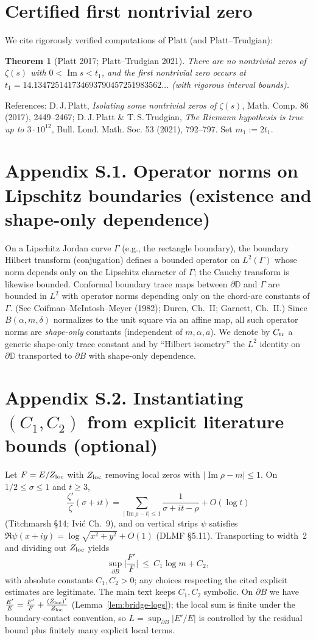 \documentclass[11pt]{article}
\numberwithin{equation}{section}
\newtheorem{theorem}{Theorem}[section]
\theoremstyle{remark}
\newcommand{\D}{\mathbb{D}}
\DeclareMathOperator{\Imag}{Im}
\begin{document}
\section{Certified first nontrivial zero}\label{app:firstheight-certified}
We cite rigorously verified computations of Platt (and Platt--Trudgian):
\begin{theorem}[Platt 2017; Platt--Trudgian 2021]
There are no nontrivial zeros of $\zeta(s)$ with $0<\Imag s<t_1$, and the first nontrivial zero occurs at
$t_1=14.134725141734693790457251983562\ldots$ (with rigorous interval bounds).
\end{theorem}
References:
D.\,J.\,Platt, \emph{Isolating some nontrivial zeros of $\zeta(s)$}, Math. Comp. 86 (2017), 2449–2467;
D.\,J.\,Platt \& T.\,S.\,Trudgian, \emph{The Riemann hypothesis is true up to $3\cdot 10^{12}$}, Bull. Lond. Math. Soc. 53 (2021), 792–797.
Set $m_1:=2t_1$.

\section*{Appendix S.1. Operator norms on Lipschitz boundaries (existence and shape-only dependence)}
On a Lipschitz Jordan curve $\Gamma$ (e.g., the rectangle boundary), the boundary Hilbert transform (conjugation) defines a bounded operator on $L^2(\Gamma)$ whose norm depends only on the Lipschitz character of $\Gamma$; the Cauchy transform is likewise bounded. Conformal boundary trace maps between $\partial\D$ and $\Gamma$ are bounded in $L^2$ with operator norms depending only on the chord-arc constants of $\Gamma$. (See Coifman--McIntosh--Meyer (1982); Duren, Ch.~II; Garnett, Ch.~II.)
Since $B(\alpha,m,\delta)$ normalizes to the unit square via an affine map, all such operator norms are \emph{shape-only} constants (independent of $m,\alpha,a$). We denote by $C_{\rm tr}$ a generic shape-only trace constant and by “Hilbert isometry” the $L^2$ identity on $\partial\D$ transported to $\partial B$ with shape-only dependence.

\section*{Appendix S.2. Instantiating $(C_1,C_2)$ from explicit literature bounds (optional)}
Let $F=E/Z_{\rm loc}$ with $Z_{\rm loc}$ removing local zeros with $|\Imag\rho-m|\le 1$. On $1/2\le\sigma\le 1$ and $t\ge 3$,
\[
\frac{\zeta'}{\zeta}(\sigma+it)=\sum_{|\Imag\rho-t|\le 1}\frac{1}{\sigma+it-\rho}+O(\log t)
\]
(Titchmarsh §14; Ivi\'c Ch.~9), and on vertical strips $\psi$ satisfies $\Re\psi(x+iy)=\log\sqrt{x^2+y^2}+O(1)$ (DLMF §5.11). Transporting to width~2 and dividing out $Z_{\rm loc}$ yields
\[
\sup_{\partial B}\Big|\frac{F'}{F}\Big|\ \le\ C_1\log m + C_2,
\]
with absolute constants $C_1,C_2>0$; any choices respecting the cited explicit estimates are legitimate. The main text keeps $C_1,C_2$ symbolic.
On $\partial B$ we have $\frac{E'}{E}=\frac{F'}{F}+\frac{(Z_{\rm loc})'}{Z_{\rm loc}}$ (Lemma~\ref{lem:bridge-logs}); the local sum is finite under the boundary‑contact convention, so $L=\sup_{\partial B}|E'/E|$ is controlled by the residual bound plus finitely many explicit local terms.
\end{document}
